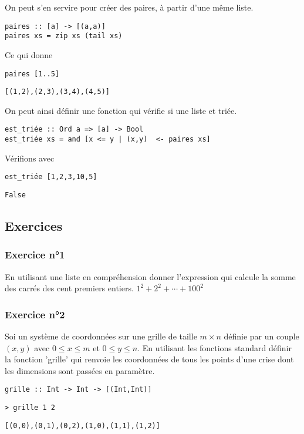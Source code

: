 \documentclass[11pt]{article}
\begin{document}
On peut s'en servire pour créer des paires, à partir d'une même liste.
\begin{verbatim}
paires :: [a] -> [(a,a)]
paires xs = zip xs (tail xs)
\end{verbatim}
Ce qui donne
\begin{verbatim}
paires [1..5]
\end{verbatim}
\begin{verbatim}
[(1,2),(2,3),(3,4),(4,5)]
\end{verbatim}


On peut ainsi définir une fonction qui vérifie si une liste et triée.
\begin{verbatim}
est_triée :: Ord a => [a] -> Bool 
est_triée xs = and [x <= y | (x,y)  <- paires xs]
\end{verbatim}
Vérifions avec
\begin{verbatim}
est_triée [1,2,3,10,5]
\end{verbatim}
\begin{verbatim}
False
\end{verbatim}

\subsection{Exercices}
\label{sec:org1d611d4}
\subsubsection{Exercice n°1}
\label{sec:org5387fce}
En utilisant une liste en compréhension donner l'expression qui calcule la somme des carrés des cent premiers entiers.
\(1^2+2^2+\cdots{}+100^2\)

\subsubsection{Exercice n°2}
\label{sec:orgb7b6f96}
Soi un système de coordonnées sur une grille de taille \(m\times n\)  définie par  un couple \((x,y)\) avec \(0\leq x \leq m\) et \(0 \leq y \leq n\).
En utilisant les fonctions standard définir la fonction 'grille'  qui renvoie les coordonnées de tous les points d'une crise dont les dimensions sont passées en paramètre.
\begin{verbatim}
grille :: Int -> Int -> [(Int,Int)]
\end{verbatim}
\begin{verbatim}
> grille 1 2
\end{verbatim}
\begin{verbatim}
[(0,0),(0,1),(0,2),(1,0),(1,1),(1,2)]
\end{verbatim}
\end{document}
